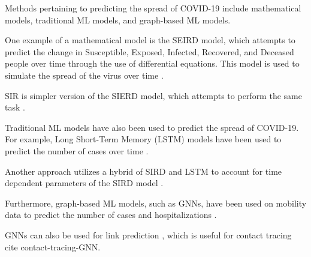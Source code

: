 \documentclass[times, 10pt,twocolumn]{article}
\begin{document}
Methods pertaining to predicting the spread of COVID-19 include mathematical models, traditional ML models, and graph-based ML models. 

One example of a mathematical model is the SEIRD model, which attempts to predict the change in Susceptible, Exposed, Infected, Recovered, and Deceased people over time through the use of differential equations. This model is used to simulate the spread of the virus over time \cite{SEIRD-LSTM}.

SIR is simpler version of the SIERD model, which attempts to perform the same task \cite{SIR}.

Traditional ML models have also been used to predict the spread of COVID-19. For example, Long Short-Term Memory (LSTM) models have been used to predict the number of cases over time \cite{SEIRD-LSTM}. 

Another approach utilizes a hybrid of SIRD and LSTM to account for time dependent parameters of the SIRD model \cite{SIRD-LSTM-hybrid}.

Furthermore, graph-based ML models, such as GNNs, have been used on mobility data to predict the number of cases and hospitalizations \cite{positivity-hospitalization-GNN}.

GNNs can also be used for link prediction \cite{link-prediction-GNN}, which is useful for contact tracing cite {contact-tracing-GNN}. 



\end{document}
